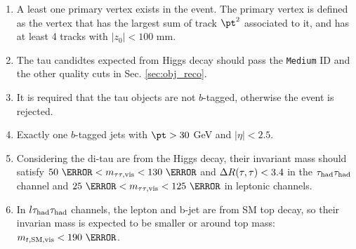 \begin{enumerate}
\item A least one primary vertex exists in the event. The primary vertex is defined as the vertex that has the largest sum of track $\pt^2$ associated to it, and has at least 4 tracks with $|z_0|<100$ mm.
\item The tau candidtes expected from Higgs decay should pass the \texttt{Medium} ID and the other quality cuts in Sec. \ref{sec:obj_reco}.
\item It is required that the tau objects are not $b$-tagged, otherwise the event is rejected.
\item Exactly one $b$-tagged jets with $\pt>30$ GeV and $|\eta|<2.5$. 
\item Considering the di-tau are from the Higgs decay, their invariant mass should satisfy $50~\GeV<\ttvismass<130~\GeV$ and $\Delta R(\tau,\tau)<3.4$ in the $\tau_\text{had}{}\tau_\text{had}$ channel and $25~\GeV<\ttvismass<125~\GeV$ in leptonic channels.
\item  In $l\tau_\text{had}{}\tau_\text{had}$ channels, the lepton and b-jet are from SM top decay, so their invarian mass is expected to be smaller or around top mass: $\tlvismass<190~\GeV$.
\end{enumerate}





